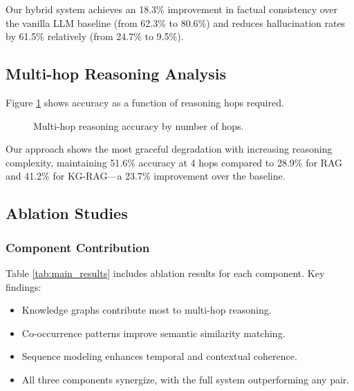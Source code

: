 \documentclass[conference]{IEEEtran}
\begin{document}
Our hybrid system achieves an 18.3\% improvement in factual consistency over the vanilla LLM baseline (from 62.3\% to 80.6\%) and reduces hallucination rates by 61.5\% relatively (from 24.7\% to 9.5\%).

\subsection{Multi-hop Reasoning Analysis}

Figure \ref{fig:multihop} shows accuracy as a function of reasoning hops required.

\begin{figure}[h]
\centering
{}
\caption{Multi-hop reasoning accuracy by number of hops.}
\label{fig:multihop}
\end{figure}

Our approach shows the most graceful degradation with increasing reasoning complexity, maintaining 51.6\% accuracy at 4 hops compared to 28.9\% for RAG and 41.2\% for KG-RAG—a 23.7\% improvement over the baseline.

\subsection{Ablation Studies}

\subsubsection{Component Contribution}

Table \ref{tab:main_results} includes ablation results for each component. Key findings:

\begin{itemize}
    \item Knowledge graphs contribute most to multi-hop reasoning.
    \item Co-occurrence patterns improve semantic similarity matching.
    \item Sequence modeling enhances temporal and contextual coherence.
    \item All three components synergize, with the full system outperforming any pair.
\end{itemize}
\end{document}
